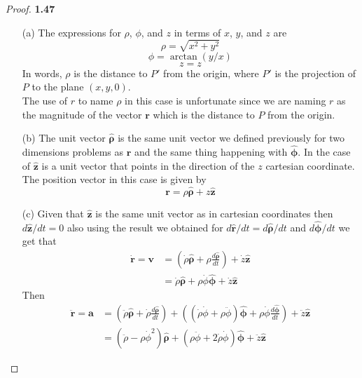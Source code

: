 \documentclass[11pt]{article}
\newcommand{\hatr}{\bm{\hat{r}}}
\newcommand{\hatz}{\bm{\hat{z}}}
\newcommand{\hatphi}{\bm{\hat{\phi}}}
\newcommand{\hatrho}{\bm{\hat{\rho}}}
\begin{document}
    \begin{proof}{\textbf{1.47}}
        \begin{itemize}
            \item[(a)] The expressions for $\rho$, $\phi$, and $z$ in terms of
            $x$, $y$, and $z$ are
            $$\rho = \sqrt{x^2 + y^2}$$
            $$\phi = \arctan{(y/x)}$$
            $$z = z$$
            In words, $\rho$ is the distance to $P'$ from the origin, where
            $P'$ is the projection of $P$ to the plane $(x,y,0)$.\\
            The use of $r$ to name $\rho$ in this case is unfortunate since we
            are naming $r$ as the magnitude of the vector $\bm{r}$ which is the
            distance to $P$ from the origin.
            \item[(b)] The unit vector $\hatrho$ is the same unit vector we
            defined previously for two dimensions problems as $\hatr$ and the same
            thing happening with $\hatphi$. In the case of $\hatz$ is a unit
            vector that points in the direction of the $z$ cartesian coordinate.\\
            The position vector in this case is given by
            $$\bm{r} = \rho\hatrho + z \hatz$$
            \item[(c)] Given that $\hatz$ is the same unit vector as in
            cartesian coordinates then $d\hatz/dt = 0$ also using the result
            we obtained for $d\hatr/dt = d\hatrho/dt$ and $d\hatphi/dt$ we get
            that
            \begin{align*}
                \dot{\bm{r}} = \bm{v} &= \left(
                    \dot{\rho}\hatrho + \rho\frac{d\hatrho}{dt}
                \right) + \dot{z}\hatz \\
                             &= \dot{\rho}\hatrho + \rho\dot{\phi}\hatphi
                + \dot{z}\hatz
            \end{align*}
            Then
            \begin{align*}
                \ddot{\bm{r}} = \bm{a} &= \left(
                    \ddot{\rho}\hatrho + \dot{\rho}\frac{d\hatrho}{dt}
                \right) +
                \left(
                    (\dot{\rho}\dot{\phi} + \rho \ddot{\phi})\hatphi +
                    \rho\dot{\phi}\frac{d\hatphi}{dt}
                \right) + \ddot{z}\hatz \\
                             &= (\ddot{\rho} - \rho\dot{\phi}^2)\hatrho +
                (\rho\ddot{\phi} + 2\dot{\rho}\dot{\phi})\hatphi + \ddot{z}\hatz
            \end{align*}
        \end{itemize}
    \end{proof}
\end{document}
